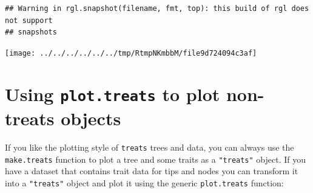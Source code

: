 \documentclass[
]{book}
\newenvironment{Shaded}{\begin{snugshade}}{\end{snugshade}}
\newcommand{\CommentTok}[1]{\textcolor[rgb]{0.56,0.35,0.01}{\textit{#1}}}
\newcommand{\DataTypeTok}[1]{\textcolor[rgb]{0.13,0.29,0.53}{#1}}
\newcommand{\DecValTok}[1]{\textcolor[rgb]{0.00,0.00,0.81}{#1}}
\newcommand{\KeywordTok}[1]{\textcolor[rgb]{0.13,0.29,0.53}{\textbf{#1}}}
\newcommand{\NormalTok}[1]{#1}
\newcommand{\OperatorTok}[1]{\textcolor[rgb]{0.81,0.36,0.00}{\textbf{#1}}}
\newcommand{\OtherTok}[1]{\textcolor[rgb]{0.56,0.35,0.01}{#1}}
\newcommand{\StringTok}[1]{\textcolor[rgb]{0.31,0.60,0.02}{#1}}
\begin{document}
\begin{verbatim}
## Warning in rgl.snapshot(filename, fmt, top): this build of rgl does not support
## snapshots
\end{verbatim}

\texttt{[image: ../../../../../../tmp/RtmpNKmbbM/file9d724094c3af]}

\hypertarget{using-plot.treats-to-plot-non-treats-objects}{%
\section{\texorpdfstring{Using \texttt{plot.treats} to plot non-treats objects}{Using plot.treats to plot non-treats objects}}\label{using-plot.treats-to-plot-non-treats-objects}}

If you like the plotting style of \texttt{treats} trees and data, you can always use the \texttt{make.treats} function to plot a tree and some traits as a \texttt{"treats"} object.
If you have a dataset that contains trait data for tips and nodes you can transform it into a \texttt{"treats"} object and plot it using the generic \texttt{plot.treats} function:

\begin{Shaded}
\end{Shaded}
\end{document}
